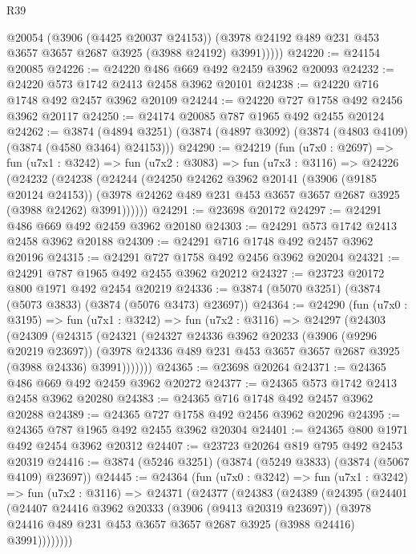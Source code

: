 \begin{lexlean}{R39}
\begin{coremodule}
            @20054
            (@3906 (@4425 @20037 @24153))
            (@3978 @24192 @489 @231 @453 @3657 @3657 @2687 @3925 (@3988 @24192) @3991)))))
@24220 := @24154 @20085
@24226 := @24220 @486 @669 @492 @2459 @3962 @20093
@24232 := @24220 @573 @1742 @2413 @2458 @3962 @20101
@24238 := @24220 @716 @1748 @492 @2457 @3962 @20109
@24244 := @24220 @727 @1758 @492 @2456 @3962 @20117
@24250 := @24174 @20085 @787 @1965 @492 @2455 @20124
@24262 := @3874
    (@4894 @3251)
    (@3874 (@4897 @3092) (@3874 (@4803 @4109) (@3874 (@4580 @3464) @24153)))
@24290 := @24219
    (fun (u7x0 : @2697) =>
    fun (u7x1 : @3242) =>
    fun (u7x2 : @3083) =>
    fun (u7x3 : @3116) =>
    @24226
      (@24232
        (@24238
          (@24244
            (@24250
              @24262
              @3962
              @20141
              (@3906 (@9185 @20124 @24153))
              (@3978 @24262 @489 @231 @453 @3657 @3657 @2687 @3925 (@3988 @24262) @3991))))))
@24291 := @23698 @20172
@24297 := @24291 @486 @669 @492 @2459 @3962 @20180
@24303 := @24291 @573 @1742 @2413 @2458 @3962 @20188
@24309 := @24291 @716 @1748 @492 @2457 @3962 @20196
@24315 := @24291 @727 @1758 @492 @2456 @3962 @20204
@24321 := @24291 @787 @1965 @492 @2455 @3962 @20212
@24327 := @23723 @20172 @800 @1971 @492 @2454 @20219
@24336 := @3874 (@5070 @3251) (@3874 (@5073 @3833) (@3874 (@5076 @3473) @23697))
@24364 := @24290
    (fun (u7x0 : @3195) =>
    fun (u7x1 : @3242) =>
    fun (u7x2 : @3116) =>
    @24297
      (@24303
        (@24309
          (@24315
            (@24321
              (@24327
                @24336
                @3962
                @20233
                (@3906 (@9296 @20219 @23697))
                (@3978 @24336 @489 @231 @453 @3657 @3657 @2687 @3925 (@3988 @24336) @3991)))))))
@24365 := @23698 @20264
@24371 := @24365 @486 @669 @492 @2459 @3962 @20272
@24377 := @24365 @573 @1742 @2413 @2458 @3962 @20280
@24383 := @24365 @716 @1748 @492 @2457 @3962 @20288
@24389 := @24365 @727 @1758 @492 @2456 @3962 @20296
@24395 := @24365 @787 @1965 @492 @2455 @3962 @20304
@24401 := @24365 @800 @1971 @492 @2454 @3962 @20312
@24407 := @23723 @20264 @819 @795 @492 @2453 @20319
@24416 := @3874 (@5246 @3251) (@3874 (@5249 @3833) (@3874 (@5067 @4109) @23697))
@24445 := @24364
    (fun (u7x0 : @3242) =>
    fun (u7x1 : @3242) =>
    fun (u7x2 : @3116) =>
    @24371
      (@24377
        (@24383
          (@24389
            (@24395
              (@24401
                (@24407
                  @24416
                  @3962
                  @20333
                  (@3906 (@9413 @20319 @23697))
                  (@3978 @24416 @489 @231 @453 @3657 @3657 @2687 @3925 (@3988 @24416) @3991))))))))

\end{coremodule}
\end{lexlean}
